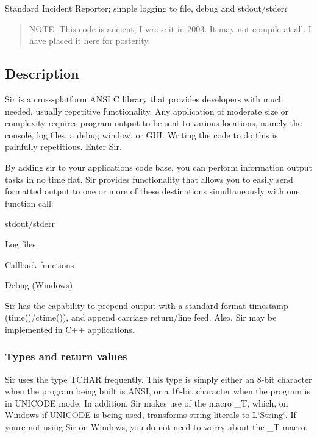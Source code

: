 Standard Incident Reporter; simple logging to file, debug and stdout/stderr

\begin{quote}
N\+O\+TE\+: This code is ancient; I wrote it in 2003. It may not compile at all. I have placed it here for posterity. \end{quote}


\subsection*{Description}

Sir is a cross-\/platform A\+N\+SI C library that provides developers with much needed, usually repetitive functionality. Any application of moderate size or complexity requires program output to be sent to various locations, namely the console, log files, a debug window, or G\+UI. Writing the code to do this is painfully repetitious. Enter Sir.

By adding sir to your application\textquotesingle{}s code base, you can perform information output tasks in no time flat. Sir provides functionality that allows you to easily send formatted output to one or more of these destinations simultaneously with one function call\+:


\begin{DoxyItemize}
\item stdout/stderr
\item Log files
\item Callback functions
\item Debug (Windows)
\end{DoxyItemize}

Sir has the capability to prepend output with a standard format timestamp (time()/ctime()), and append carriage return/line feed. Also, Sir may be implemented in C++ applications.

\subsubsection*{Types and return values}

Sir uses the type T\+C\+H\+AR frequently. This type is simply either an 8-\/bit character when the program being built is A\+N\+SI, or a 16-\/bit character when the program is in U\+N\+I\+C\+O\+DE mode. In addition, Sir makes use of the macro \+\_\+T, which, on Windows if U\+N\+I\+C\+O\+DE is being used, transforms string literals to L\char`\"{}\+String\char`\"{}. If you\textquotesingle{}re not using Sir on Windows, you do not need to worry about the \+\_\+T macro.

